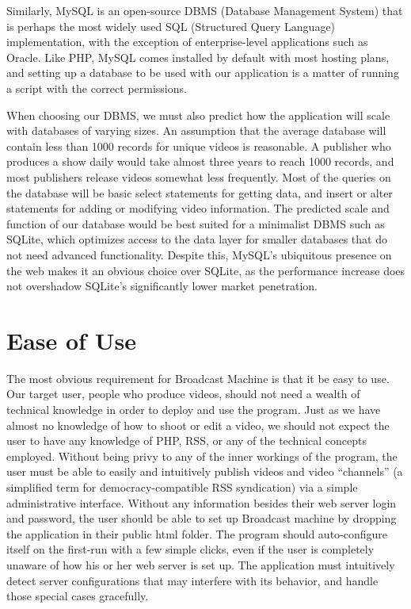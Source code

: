 \documentclass[a4paper,12pt]{report}
\begin{document}
Similarly, MySQL is an open-source DBMS (Database Management System) that is perhaps the most widely used SQL (Structured Query Language) implementation, with the exception of enterprise-level applications such as Oracle. Like PHP, MySQL comes installed by default with most hosting plans, and setting up a database to be used with our application is a matter of running a script with the correct permissions. 

When choosing our DBMS, we must also predict how the application will scale with databases of varying sizes. An assumption that the average database will contain less than 1000 records for unique videos is reasonable. A publisher who produces a show daily would take almost three years to reach 1000 records, and most publishers release videos somewhat less frequently. Most of the queries on the database will be basic select statements for getting data, and insert or alter statements for adding or modifying video information. The predicted scale and function of our database would be best suited for a minimalist DBMS such as SQLite, which optimizes access to the data layer for smaller databases that do not need advanced functionality. Despite this, MySQL’s ubiquitous presence on the web makes it an obvious choice over SQLite, as the performance increase does not overshadow SQLite’s significantly lower market penetration.

\section{Ease of Use}

	The most obvious requirement for Broadcast Machine is that it be easy to use. Our target user, people who produce videos, should not need a wealth of technical knowledge in order to deploy and use the program. Just as we have almost no knowledge of how to shoot or edit a video, we should not expect the user to have any knowledge of PHP, RSS, or any of the technical concepts employed. Without being privy to any of the inner workings of the program, the user must be able to easily and intuitively publish videos and video “channels” (a simplified term for democracy-compatible RSS syndication) via a simple administrative interface. Without any information besides their web server login and password, the user should be able to set up Broadcast machine by dropping the application in their public html folder. The program should auto-configure itself on the first-run with a few simple clicks, even if the user is completely unaware of how his or her web server is set up. The application must intuitively detect server configurations that may interfere with its behavior, and handle those special cases gracefully.
\end{document}
